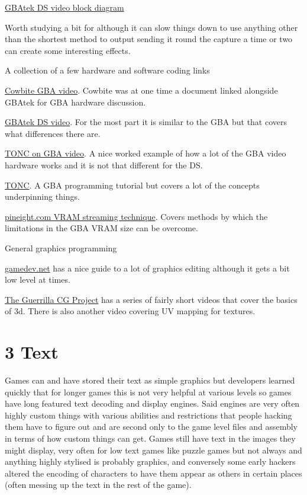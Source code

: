 \documentclass[
]{book}
\begin{document}
\href{http://problemkaputt.de/gbatek.htm\#dsvideodisplaysystemblockdiagram}{GBAtek DS video block diagram}

Worth studying a bit for although it can slow things down to use anything other than the shortest method to output sending it round the capture a time or two can create some interesting effects.

A collection of a few hardware and software coding links

\href{http://www.cs.rit.edu/~tjh8300/CowBite/CowBiteSpec.htm\#Graphics\%20Hardware\%20Overview}{Cowbite GBA video}. Cowbite was at one time a document linked alongside GBAtek for GBA hardware discussion.

\href{http://problemkaputt.de/gbatek.htm\#dsvideo}{GBAtek DS video}. For the most part it is similar to the GBA but that covers what differences there are.

\href{http://www.coranac.com/tonc/text/video.htm}{TONC on GBA video}. A nice worked example of how a lot of the GBA video hardware works and it is not that different for the DS.

\href{http://www.coranac.com/tonc/text/toc.htm}{TONC}. A GBA programming tutorial but covers a lot of the concepts underpinning things.

\href{http://pineight.com/gba/managing-sprite-vram.txt}{pineight.com VRAM streaming technique}. Covers methods by which the limitations in the GBA VRAM size can be overcome.

General graphics programming

\href{http://www.gamedev.net/page/resources/_/technical/graphics-programming-and-theory/graphics-programming-black-book-r1698}{gamedev.net} has a nice guide to a lot of graphics editing although it gets a bit low level at times.

\href{http://www.youtube.com/playlist?list=PL6A7DF3D7866EB076\&feature=plpp}{The Guerrilla CG Project} has a series of fairly short videos that cover the basics of 3d. There is also another video covering UV mapping for textures.

\hypertarget{text}{%
\chapter{3 Text}\label{text}}

Games can and have stored their text as simple graphics but developers learned quickly that for longer games this is not very helpful at various levels so games have long featured text decoding and display engines. Said engines are very often highly custom things with various abilities and restrictions that people hacking them have to figure out and are second only to the game level files and assembly in terms of how custom things can get. Games still have text in the images they might display, very often for low text games like puzzle games but not always and anything highly stylised is probably graphics, and conversely some early hackers altered the encoding of characters to have them appear as others in certain places (often messing up the text in the rest of the game).
\end{document}
